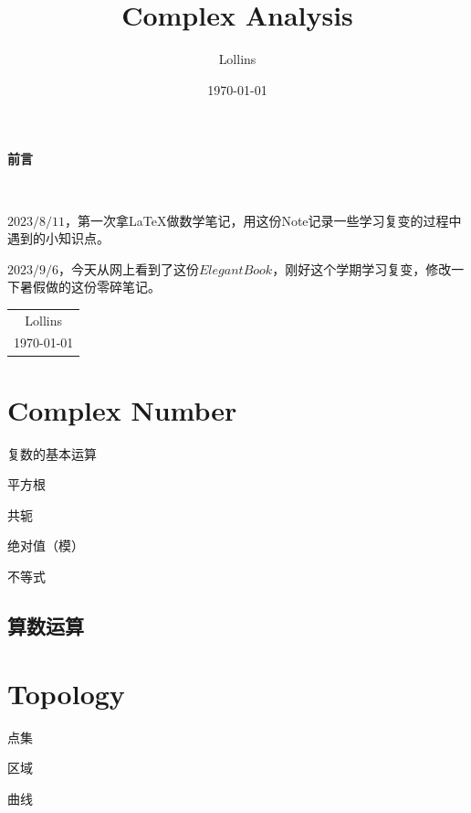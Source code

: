 \documentclass[lang=cn,10pt]{elegantbook}
\title{Complex Analysis}
\author{Lollins}
\date{\today}
\begin{document}
\maketitle

\begin{center}
	\Huge\textbf{前言}
\end{center}~\

$2023/8/11$，第一次拿\LaTeX 做数学笔记，用这份Note记录一些学习复变的过程中遇到的小知识点。

$2023/9/6$，今天从网上看到了这份$ElegantBook$，刚好这个学期学习复变，修改一下暑假做的这份零碎笔记。
~\\
\begin{flushright}
	\begin{tabular}{c}
		Lollins \\
		\today
	\end{tabular}
\end{flushright}


\frontmatter

\tableofcontents

\mainmatter




\chapter{Complex Number}
\begin{introduction}
	\item 复数的基本运算
	\item 平方根
	\item 共轭
	\item 绝对值（模）
	\item 不等式
\end{introduction}

\section{算数运算}








\appendix
\chapter{Topology}
\begin{introduction}
	\item 点集
	\item 区域
	\item 曲线
\end{introduction}
\end{document}
